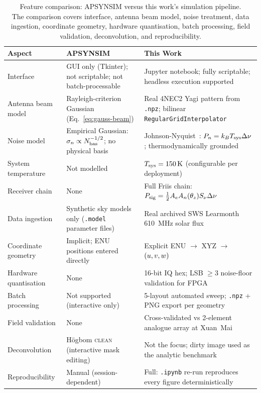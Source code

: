 \begin{table}[H]
  \centering
  \caption[Feature comparison: \textsc{APSYNSIM} versus this work's simulation pipeline]{Feature comparison: \textsc{APSYNSIM} versus this work's simulation pipeline.\\[4pt]
  The comparison covers interface, antenna beam model, noise treatment, data
  ingestion, coordinate geometry, hardware quantisation, batch processing,
  field validation, deconvolution, and reproducibility.}
  \label{tab:apsynsim-comparison}
  \renewcommand{\arraystretch}{1.35}
  \begin{tabularx}{\textwidth}{l X X}
    \toprule
    \textbf{Aspect} & \textbf{\textsc{APSYNSIM}} & \textbf{This Work} \\
    \midrule
    Interface
      & GUI only (Tkinter); not scriptable; not batch-processable
      & Jupyter notebook; fully scriptable; headless execution supported \\
    Antenna beam model
      & Rayleigh-criterion Gaussian (Eq.~\eqref{eq:gauss-beam})
      & Real 4NEC2 Yagi pattern from \texttt{.npz};
        bilinear \texttt{RegularGridInterpolator} \\
    Noise model
      & Empirical Gaussian: $\sigma_n \propto N_{\rm bas}^{-1/2}$; no physical basis
      & Johnson-Nyquist~\citep{nyquist1928}: $P_n = k_B T_{\rm sys}\Delta\nu$; thermodynamically grounded \\
    System temperature
      & Not modelled
      & $T_{\rm sys} = \SI{150}{\kelvin}$ (configurable per deployment) \\
    Receiver chain
      & None
      & Full Friis chain: $P_{\rm sig}=\tfrac{1}{2}A_e A_n(\theta_z) S_\nu \Delta\nu$ \\
    Data ingestion
      & Synthetic sky models only (\texttt{.model} parameter files)
      & Real archived SWS Learmonth \SI{610}{\mega\hertz} solar flux \\
    Coordinate geometry
      & Implicit; ENU positions entered directly
      & Explicit ENU $\rightarrow$ XYZ $\rightarrow$ $(u,v,w)$~\citep{tms2017} \\
    Hardware quantisation
      & None
      & 16-bit IQ hex; LSB $\geq 3$ noise-floor validation for FPGA \\
    Batch processing
      & Not supported (interactive only)
      & 5-layout automated sweep; \texttt{.npz} + PNG export per geometry \\
    Field validation
      & None
      & Cross-validated vs 2-element analogue array at Xuan~Mai \\
    Deconvolution
      & H\"ogbom \textsc{clean} (interactive mask editing)
      & Not the focus; dirty image used as the analytic benchmark \\
    Reproducibility
      & Manual (session-dependent)
      & Full: \texttt{.ipynb} re-run reproduces every figure deterministically \\
    \bottomrule
  \end{tabularx}
\end{table}

